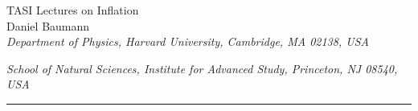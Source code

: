 \documentclass[12pt,letterpaper,rotate]{article}
\begin{document}
\vspace{5mm} \vspace{0.5cm}


\begin{center}

 {\Large TASI Lectures on Inflation} 
 \\[1.0cm]

{Daniel Baumann}
\\[0.5cm]

{\small \sl Department of Physics, Harvard University, Cambridge, MA 02138, USA}

{\small \sl School of Natural Sciences, 
 Institute for Advanced Study,
Princeton, NJ 08540, USA}


\end{center}
\vspace{2cm} \hrule \vspace{0.3cm}
\end{document}
